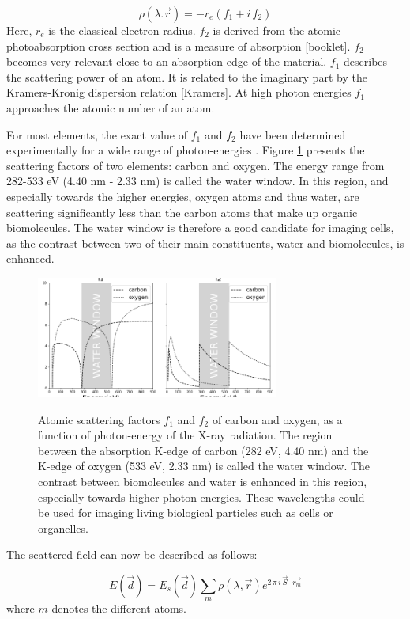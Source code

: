 \begin{equation}
\rho(\lambda.\vec{r}) = -r_e (f_1 + i\,f_2)
\end{equation}
Here, $r_e$ is the classical electron radius. $f_2$ is derived from the atomic photoabsorption cross section and is a measure of absorption [booklet]. $f_2$ becomes very relevant close to an absorption edge of the material. $f_1$ describes the scattering power of an atom. It is related to the imaginary part by the Kramers-Kronig dispersion relation [Kramers]. At high photon energies $f_1$ approaches the atomic number of an atom.  

For most elements, the exact value of $f_1$ and $f_2$ have been determined experimentally for a wide range of photon-energies \cite{Henke1990}. Figure \ref{fig:waterwindow} presents the scattering factors of two elements: carbon and oxygen. The energy range from 282-533 eV (4.40 nm - 2.33 nm) is called the water window. In this region, and especially towards the higher energies, oxygen atoms and thus water, are scattering significantly less than the carbon atoms that  make up organic biomolecules. The water window is therefore a good candidate for imaging cells, as the contrast between two of their main constituents, water and biomolecules, is enhanced.

\begin{figure}[h]
\centering 
\includegraphics[width=80mm]{waterwindow.png}
\label{fig:waterwindow}
\caption{Atomic scattering factors $f_1$ and $f_2$ of carbon and oxygen, as a function of photon-energy of the X-ray radiation. The region between the absorption K-edge of carbon (282 eV, 4.40 nm) and the K-edge of oxygen (533 eV, 2.33 nm) is called the water window.  The contrast between biomolecules and water is enhanced in this region, especially towards higher photon energies. These wavelengths could be used for imaging living biological particles such as cells or organelles.}
\end{figure}

The scattered field can now be described as follows:

\begin{equation}\label{eq:boehoe2}
E(\vec{d}) = E_s(\vec{d}) \sum_{m} \rho(\lambda,\vec{r}) e^{2\,\pi\,  i\,\vec{S}\cdot\vec{r_m}}
\end{equation}
where $m$ denotes the different atoms.

